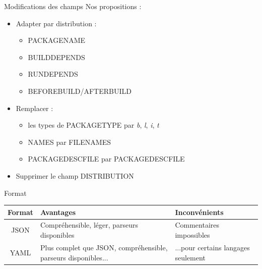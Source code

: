 \documentclass[11pt,xcolor=dvipsnames]{beamer}
\begin{document}
\begin{frame}{Modifications des champs}
	Nos propositions :
	\begin{itemize}
		\item Adapter par distribution :
			\begin{itemize}
				\item {\tiny *PACKAGENAME}
				\item {\tiny *BUILDDEPENDS}
				\item {\tiny *RUNDEPENDS}
				\item {\tiny BEFOREBUILD}/{\tiny AFTERBUILD}
			\end{itemize}
		\item Remplacer :
			\begin{itemize}
				\item les types de {\tiny PACKAGETYPE} par \textit{b}, \textit{l}, \textit{i}, \textit{t}
				\item {\tiny *NAMES} par {\tiny FILENAMES}
				\item {\tiny *PACKAGEDESCFILE} par {\tiny PACKAGEDESCFILE}
			\end{itemize}
		\item Supprimer le champ {\tiny DISTRIBUTION}
	\end{itemize}
\end{frame}

\begin{frame}{Format}
	\begin{tabular}{|c|p{4cm}|p{4cm}|}
		\hline
		Format & Avantages & Inconvénients \\
		\hline
		JSON & Compréhensible, léger, parseurs disponibles & Commentaires impossibles\\
		\hline
		YAML & Plus complet que JSON, compréhensible, parseurs disponibles... & ...pour certains langages seulement \\ 
		\hline
	\end{tabular}
\end{frame}
\end{document}
